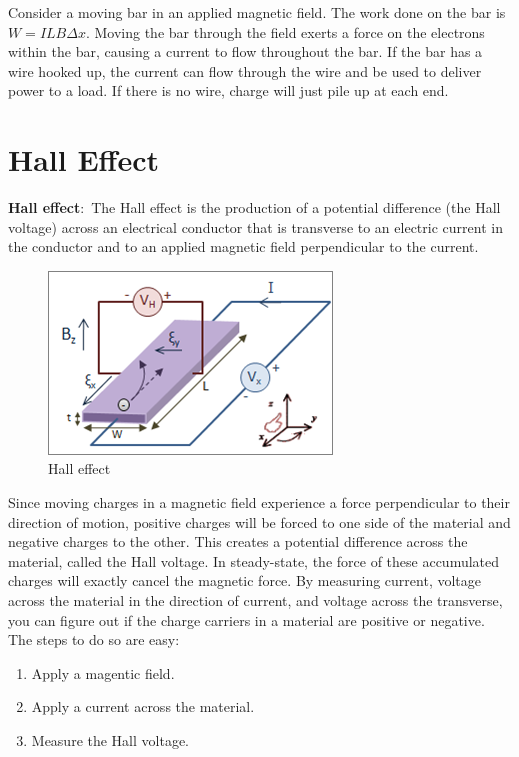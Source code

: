 \documentclass[nobib]{tufte-handout}
\newcommand{\defn}[2]{\noindent\textbf{#1}:\ #2}
\begin{document}
Consider a moving bar in an applied magnetic field. The work done on the bar 
is $ W= ILB \Delta x$. Moving the bar through the field exerts a force on 
the electrons within the bar, causing a current to flow throughout the bar. 
If the bar has a wire hooked up, the current can flow through the wire and be 
used to deliver power to a load. If there is no wire, charge will just pile 
up at each end. 

\section{Hall Effect}
\defn{Hall effect}{The Hall effect is the production of a potential 
difference (the Hall voltage) across an electrical conductor that 
is transverse to an electric current in the conductor and to an 
applied magnetic field perpendicular to the current}. 
\begin{figure}
    \center 
    \caption{Hall effect}
    \label{fig:hall}
    \includegraphics*{images/Hall_Effect_Measurement_Setup_for_Electrons.png}
\end{figure}
Since moving charges in a magnetic field experience a force perpendicular to their 
direction of motion, positive charges will be forced to one side of the material and 
negative charges to the other. This creates a potential difference across the material, 
called the Hall voltage. In steady-state, the force of these accumulated charges 
will exactly cancel the magnetic force. 
By measuring current, voltage across the material in the direction of current, 
and voltage across the transverse, you can figure out if the charge carriers 
in a material are positive or negative. 
The steps to do so are easy: 
\begin{enumerate}
    \item Apply a magentic field.
    \item Apply a current across the material. 
    \item Measure the Hall voltage. 
\end{enumerate}
\end{document}
